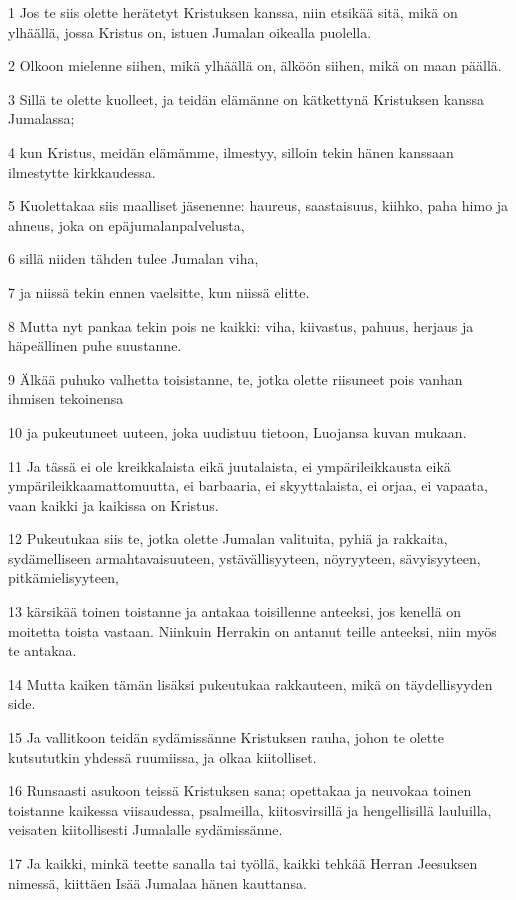 \par 1 Jos te siis olette herätetyt Kristuksen kanssa, niin etsikää sitä, mikä on ylhäällä, jossa Kristus on, istuen Jumalan oikealla puolella.
\par 2 Olkoon mielenne siihen, mikä ylhäällä on, älköön siihen, mikä on maan päällä.
\par 3 Sillä te olette kuolleet, ja teidän elämänne on kätkettynä Kristuksen kanssa Jumalassa;
\par 4 kun Kristus, meidän elämämme, ilmestyy, silloin tekin hänen kanssaan ilmestytte kirkkaudessa.
\par 5 Kuolettakaa siis maalliset jäsenenne: haureus, saastaisuus, kiihko, paha himo ja ahneus, joka on epäjumalanpalvelusta,
\par 6 sillä niiden tähden tulee Jumalan viha,
\par 7 ja niissä tekin ennen vaelsitte, kun niissä elitte.
\par 8 Mutta nyt pankaa tekin pois ne kaikki: viha, kiivastus, pahuus, herjaus ja häpeällinen puhe suustanne.
\par 9 Älkää puhuko valhetta toisistanne, te, jotka olette riisuneet pois vanhan ihmisen tekoinensa
\par 10 ja pukeutuneet uuteen, joka uudistuu tietoon, Luojansa kuvan mukaan.
\par 11 Ja tässä ei ole kreikkalaista eikä juutalaista, ei ympärileikkausta eikä ympärileikkaamattomuutta, ei barbaaria, ei skyyttalaista, ei orjaa, ei vapaata, vaan kaikki ja kaikissa on Kristus.
\par 12 Pukeutukaa siis te, jotka olette Jumalan valituita, pyhiä ja rakkaita, sydämelliseen armahtavaisuuteen, ystävällisyyteen, nöyryyteen, sävyisyyteen, pitkämielisyyteen,
\par 13 kärsikää toinen toistanne ja antakaa toisillenne anteeksi, jos kenellä on moitetta toista vastaan. Niinkuin Herrakin on antanut teille anteeksi, niin myös te antakaa.
\par 14 Mutta kaiken tämän lisäksi pukeutukaa rakkauteen, mikä on täydellisyyden side.
\par 15 Ja vallitkoon teidän sydämissänne Kristuksen rauha, johon te olette kutsututkin yhdessä ruumiissa, ja olkaa kiitolliset.
\par 16 Runsaasti asukoon teissä Kristuksen sana; opettakaa ja neuvokaa toinen toistanne kaikessa viisaudessa, psalmeilla, kiitosvirsillä ja hengellisillä lauluilla, veisaten kiitollisesti Jumalalle sydämissänne.
\par 17 Ja kaikki, minkä teette sanalla tai työllä, kaikki tehkää Herran Jeesuksen nimessä, kiittäen Isää Jumalaa hänen kauttansa.
